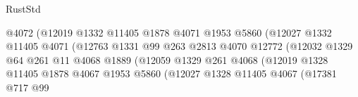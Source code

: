 \begin{lexlean}{RustStd}
\begin{coremodule}
{\begin{coremodule}
{{{{{{{{{{{{{{{{{{{{{{{{{{{{{                                              @4072
                                              (@12019
                                                @1332
                                                @11405
                                                @1878
                                                @4071
                                                @1953
                                                @5860
                                                (@12027
                                                  @1332
                                                  @11405
                                                  @4071
                                                  (@12763
                                                    @1331
                                                    @99
                                                    @263
                                                    @2813
                                                    @4070
                                                    @12772
                                                    (@12032
                                                      @1329
                                                      @64
                                                      @261
                                                      @11
                                                      @4068
                                                      @1889
                                                      (@12059
                                                        @1329
                                                        @261
                                                        @4068
                                                        (@12019
                                                          @1328
                                                          @11405
                                                          @1878
                                                          @4067
                                                          @1953
                                                          @5860
                                                          (@12027
                                                            @1328
                                                            @11405
                                                            @4067
                                                            (@17381
                                                              @717
                                                              @99
}}}}}}}}}}}}}}}}}}}}}}}}}}}}}
\end{coremodule}}
\end{coremodule}
\end{lexlean}
